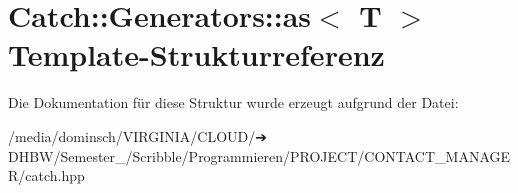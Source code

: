 \hypertarget{structCatch_1_1Generators_1_1as}{}\section{Catch\+:\+:Generators\+:\+:as$<$ T $>$ Template-\/\+Strukturreferenz}
\label{structCatch_1_1Generators_1_1as}


Die Dokumentation für diese Struktur wurde erzeugt aufgrund der Datei\+:\begin{DoxyCompactItemize}
\item 
/media/dominsch/\+V\+I\+R\+G\+I\+N\+I\+A/\+C\+L\+O\+U\+D/➔ D\+H\+B\+W/\+Semester\+\_/\+Scribble/\+Programmieren/\+P\+R\+O\+J\+E\+C\+T/\+C\+O\+N\+T\+A\+C\+T\+\_\+\+M\+A\+N\+A\+G\+E\+R/catch.\+hpp\end{DoxyCompactItemize}
